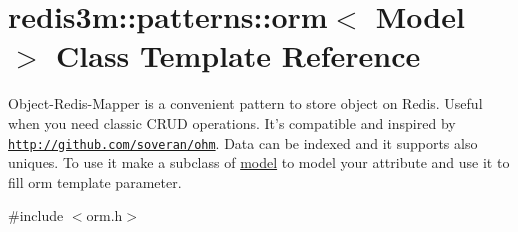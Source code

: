 \hypertarget{classredis3m_1_1patterns_1_1orm}{\section{redis3m\-:\-:patterns\-:\-:orm$<$ Model $>$ Class Template Reference}
\label{classredis3m_1_1patterns_1_1orm}
}


Object-\/\-Redis-\/\-Mapper is a convenient pattern to store object on Redis. Useful when you need classic C\-R\-U\-D operations. It's compatible and inspired by \href{http://github.com/soveran/ohm}{\tt http\-://github.\-com/soveran/ohm}. Data can be indexed and it supports also uniques. To use it make a subclass of \hyperlink{classredis3m_1_1patterns_1_1model}{model} to model your attribute and use it to fill orm template parameter.  




{\ttfamily \#include $<$orm.\-h$>$}

